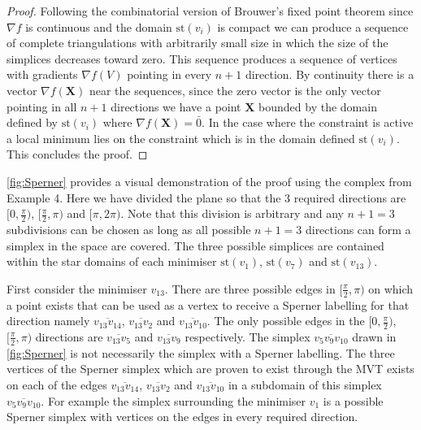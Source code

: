 \begin{proof}
Following the combinatorial version of Brouwer's fixed point theorem \cite{Henle1979} since $\nabla f$ is continuous and the domain $\textrm{st}\left( v_i \right)$ is compact we can produce a sequence of complete triangulations with arbitrarily small size in which the size of the simplices decreases toward zero. This sequence produces a sequence of vertices with gradients $\nabla f(V)$ pointing in every $n+1$ direction. By continuity there is a vector $\nabla f (\mathbf{X})$ near the sequences, since the zero vector is the only vector pointing in all $n+1$ directions we have a point $\mathbf{X}$ bounded by the domain defined by $\textrm{st}\left( v_i \right)$ where $\nabla f (\mathbf{X}) = \bar{0}$.
In the case where the constraint is active a local minimum lies on the constraint which is in the domain defined $\textrm{st}\left( v_i \right)$. This concludes the proof.
\end{proof}

\autoref{fig:Sperner} provides a visual demonstration of the proof using the complex from Example 4. Here we have divided the plane so that the 3 required directions are $[0, \frac{\pi}{2})$, $[\frac{\pi}{2}, \pi)$ and $[\pi, 2 \pi)$. Note that this division is arbitrary and any $n + 1 = 3$ subdivisions can be chosen as long as all possible $n + 1 = 3$ directions can form a simplex in the space are covered. The three possible simplices are contained within the star domains of each minimiser $\textrm{st}\left(v_{1}\right)$, $\textrm{st}\left(v_{7}\right)$ and $\textrm{st}\left(v_{13}\right)$. 

First consider the minimiser $v_{13}$. There are three possible edges in $[\frac{\pi}{2}, \pi)$ on which a point exists that can be used as a vertex to receive a Sperner labelling for that direction namely $\overline{v_{13} v_{14}}$, $\overline{v_{13} v_{2}}$ and $\overline{v_{13}  v_{10}}$. The only possible edges in the $[0, \frac{\pi}{2})$, $[\frac{\pi}{2}, \pi)$ directions are $\overline{v_{13} v_{5}}$ and $\overline{v_{13} v_{9}}$ respectively. The simplex $\overline{v_{5} v_{9} v_{10}}$ drawn in \autoref{fig:Sperner} is not necessarily the simplex with a Sperner labelling. The three vertices of the Sperner simplex which are proven to exist through the MVT exists on each of the edges $\overline{v_{13} v_{14}}$, $\overline{v_{13} v_{2}}$ and $\overline{v_{13}  v_{10}}$ in a subdomain of this simplex $\overline{v_{5} v_{9} v_{10}}$. For example the simplex surrounding the minimiser $v_{1}$ is a possible Sperner simplex with vertices on the edges in every required direction.

